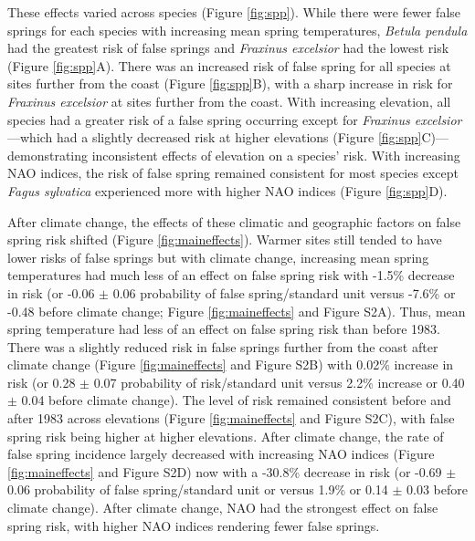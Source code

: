 \documentclass{article}\usepackage[]{graphicx}\usepackage[]{color}
\begin{document}
These effects varied across species (Figure \ref{fig:spp}). While there were fewer false springs for each species with increasing mean spring temperatures,  \textit{Betula pendula} had the greatest risk of false springs and \textit{Fraxinus excelsior} had the lowest risk (Figure \ref{fig:spp}A). There was an increased risk of false spring for all species at sites further from the coast (Figure \ref{fig:spp}B), with a sharp increase in risk for \textit{Fraxinus excelsior} at sites further from the coast. With increasing elevation, all species had a greater risk of a false spring occurring except for \textit{Fraxinus excelsior}---which had a slightly decreased risk at higher elevations (Figure \ref{fig:spp}C)---demonstrating inconsistent effects of elevation on a species' risk.  With increasing NAO indices, the risk of false spring remained consistent for most species except \textit{Fagus sylvatica} experienced more with higher NAO indices (Figure \ref{fig:spp}D). 

After climate change, the effects of these climatic and geographic factors on false spring risk shifted (Figure \ref{fig:maineffects}). Warmer sites still tended to have lower risks of false springs but with climate change, increasing mean spring temperatures had much less of an effect on false spring risk with -1.5\% decrease in risk (or -0.06 $\pm$ 0.06 probability of false spring/standard unit versus -7.6\% or -0.48 before climate change; Figure \ref{fig:maineffects} and Figure S2A). Thus, mean spring temperature had less of an effect on false spring risk than before 1983. There was a slightly reduced risk in false springs further from the coast after climate change (Figure \ref{fig:maineffects} and Figure S2B) with 0.02\% increase in risk (or 0.28 $\pm$ 0.07 probability of risk/standard unit versus 2.2\% increase or 0.40 $\pm$ 0.04 before climate change). The level of risk remained consistent before and after 1983 across elevations (Figure \ref{fig:maineffects} and Figure S2C), with false spring risk being higher at higher elevations. After climate change, the rate of false spring incidence largely decreased with increasing NAO indices (Figure \ref{fig:maineffects} and Figure S2D) now with a -30.8\% decrease in risk (or -0.69 $\pm$0.06 probability of false spring/standard unit or versus 1.9\% or 0.14 $\pm$ 0.03 before climate change). After climate change, NAO had the strongest effect on false spring risk, with higher NAO indices rendering fewer false springs. 
\end{document}
